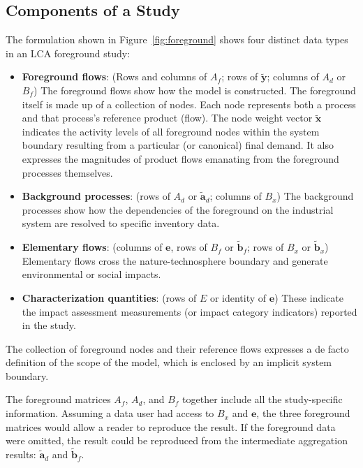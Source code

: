 \subsection{Components of a Study}

The formulation shown in Figure~\ref{fig:foreground} shows four distinct data types in an LCA foreground study: 

\begin{itemize}
\item \textbf{Foreground flows}: (Rows and columns of $A_f$; rows of $\tilde{\mathbf{y}}$; columns of $A_d$ or  $B_f$) The foreground flows show how the model is constructed.  The foreground itself is made up of a collection of nodes.  Each node represents both a process and that process's reference product (flow).  The node weight vector $\tilde{\mathbf{x}}$ indicates the activity levels of all foreground nodes within the system boundary resulting from a particular (or canonical) final demand.  It also expresses the magnitudes of product flows emanating from the foreground processes themselves.  
    
\item \textbf{Background processes}: (rows of $A_d$ or $\tilde{\mathbf{a}}_d$; columns of $B_x$) The background processes show how the dependencies of the foreground on the industrial system are resolved to specific inventory data.
  
 \item \textbf{Elementary flows}: (columns of $\mathbf{e}$, rows of $B_f$ or $\tilde{\mathbf{b}}_f$; rows of $B_x$ or $\tilde{\mathbf{b}}_x$)  Elementary flows cross the nature-technosphere boundary and generate environmental or social impacts.

 \item \textbf{Characterization quantities}: (rows of $E$ or identity of $\mathbf{e}$)  These indicate the impact assessment measurements (or impact category indicators) reported in the study.
\end{itemize}

The collection of foreground nodes and their reference flows expresses a de facto definition of the scope of the model, which is enclosed by an implicit system boundary.  %

The foreground matrices $A_f$, $A_d$, and $B_f$ together include all the study-specific information.  Assuming a data user had access to $B_x$ and $\mathbf{e}$, the three foreground matrices would allow a reader to reproduce the result.  If the foreground data were omitted, the result could be reproduced from the intermediate aggregation results: $\tilde{\mathbf{a}}_d$ and $\tilde{\mathbf{b}}_f$.

